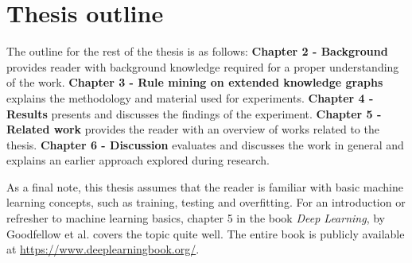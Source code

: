 


\section{Thesis outline}
The outline for the rest of the thesis is as follows: \newline \newline
\textbf{Chapter 2 - Background} provides reader with background knowledge required for a proper understanding of the work. \newline
\newline
\textbf{Chapter 3 - Rule mining on extended knowledge graphs} explains the methodology and material used for experiments. \newline
\newline
\textbf{Chapter 4 - Results} presents and discusses the findings of the experiment. \newline \newline
\textbf{Chapter 5 - Related work} provides the reader with an overview of works related to the thesis. \newline \newline
\textbf{Chapter 6 - Discussion} evaluates and discusses the work in general and explains an earlier approach explored during research.
\newline \newline

As a final note, this thesis assumes that the reader is familiar with basic machine learning concepts, such as training, testing and overfitting. For an introduction or refresher to machine learning basics, chapter 5 in the book \textit{Deep Learning}, by Goodfellow et al. \cite{goodfellow} covers the topic quite well. The entire book is publicly available at \href{https://www.deeplearningbook.org/}{https://www.deeplearningbook.org/}.
